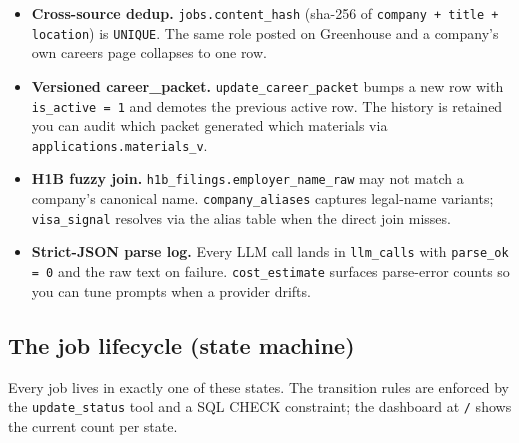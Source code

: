 \documentclass[11pt,letterpaper]{article}
\newcommand{\tool}[1]{\texttt{#1}}
\begin{document}
\begin{itemize}
\item \textbf{Cross-source dedup.} \texttt{jobs.content\_hash} (sha-256 of \texttt{company + title + location}) is \texttt{UNIQUE}. The same role posted on Greenhouse and a company's own careers page collapses to one row.
\item \textbf{Versioned career\_packet.} \tool{update\_career\_packet} bumps a new row with \texttt{is\_active = 1} and demotes the previous active row. The history is retained \textemdash{} you can audit which packet generated which materials via \texttt{applications.materials\_v}.
\item \textbf{H1B fuzzy join.} \texttt{h1b\_filings.employer\_name\_raw} may not match a company's canonical name. \texttt{company\_aliases} captures legal-name variants; \tool{visa\_signal} resolves via the alias table when the direct join misses.
\item \textbf{Strict-JSON parse log.} Every LLM call lands in \texttt{llm\_calls} with \texttt{parse\_ok = 0} and the raw text on failure. \tool{cost\_estimate} surfaces parse-error counts so you can tune prompts when a provider drifts.
\end{itemize}

\subsection{The job lifecycle (state machine)}

Every job lives in exactly one of these states. The transition rules are enforced by the \tool{update\_status} tool and a SQL CHECK constraint; the dashboard at \texttt{/} shows the current count per state.
\end{document}
